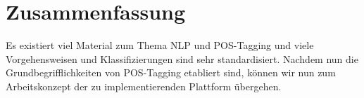 \section{Zusammenfassung}
\label{sec:related:conclusion}

Es existiert viel Material zum Thema NLP und POS-Tagging und viele Vorgehensweisen und Klassifizierungen sind sehr standardisiert. Nachdem nun die Grundbegrifflichkeiten von POS-Tagging etabliert sind, können wir nun zum Arbeitskonzept der zu implementierenden Plattform übergehen.

